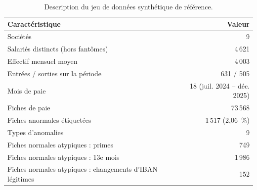 \begin{table}[htbp]
\centering
\caption{Description du jeu de données synthétique de référence.}
\label{tab:description_jeu_donnees}
\small
\begin{tabular}{lr}
\toprule
\textbf{Caractéristique} & \textbf{Valeur} \\
\midrule
Sociétés & 9 \\
Salariés distincts (hors fantômes) & 4\,621 \\
Effectif mensuel moyen & 4\,003 \\
Entrées / sorties sur la période & 631 / 505 \\
Mois de paie & 18 (juil. 2024 – déc. 2025) \\
Fiches de paie & 73\,568 \\
Fiches anormales étiquetées & 1\,517 (2,06~\%) \\
Types d'anomalies & 9 \\
Fiches normales atypiques : primes & 749 \\
Fiches normales atypiques : 13e mois & 1\,986 \\
Fiches normales atypiques : changements d'IBAN légitimes & 152 \\
\bottomrule
\end{tabular}
\end{table}
